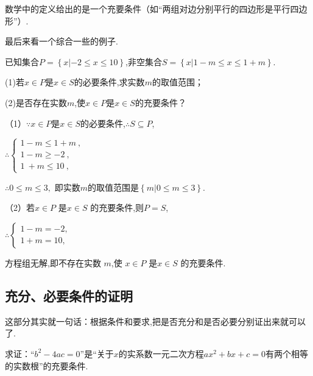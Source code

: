 \documentclass[lang=cn,math=cm,chinesefont=nofont,11pt,scheme=chinese,twocol]{elegantbook}
\begin{document}
\begin{example}
  数学中的定义给出的是一个充要条件（如“两组对边分别平行的四边形是平行四边形”）.
\end{example}

\hspace*{\fill}

最后来看一个综合一些的例子.

\begin{example}\label{2022BST_Math_BX1_RJA_P18.20}
  已知集合$P=\left\{x|-2\leq x\leqslant10\right\}$,非空集合$S=\left\{x|1-m\leqslant x\leqslant1+m\right\}.$

  (1)若$x\in P$是$x\in S$的必要条件,求实数$m$的取值范围；

  (2)是否存在实数$m$,使$x\in P$是$x\in S$的充要条件？
\end{example}

\begin{solution}
  （1）$\because x\in P$是$x\in S$的必要条件,$\therefore S\subseteq P$,

  $\therefore\begin{cases}1-m\leqslant1+m\:,\\1-m\geqslant-2\:,\\1\:+m\leqslant10\:,\end{cases}$
  
  $\therefore 0\leqslant m\leqslant 3,$
  即实数$m$的取值范围是$\left\{m|0\leqslant m\leqslant3\right\}.$

  （2）若$x\in P$ 是$x\in S$ 的充要条件,则$P=S$,

  $\therefore\begin{cases}1-m=-2,\\1+m=10,\end{cases}$
  
  方程组无解,即不存在实数 $m$,使 $x\in P$ 是$x\in S$ 的充要条件.
\end{solution}

\subsection{充分、必要条件的证明}

这部分其实就一句话：根据条件和要求,把是否充分和是否必要分别证出来就可以了.

\begin{example}\label{HS2FZ_lkb1_P26.1}
  求证：“$b^2-4ac=0$”是“关于$x$的实系数一元二次方程$ax^2+bx+c=0$有两个相等的实数根”的充要条件.
\end{example}
\end{document}
